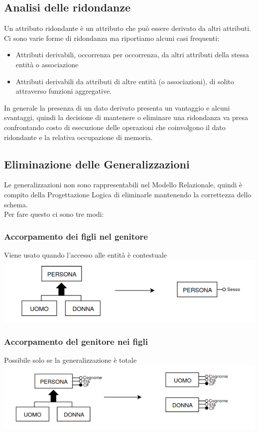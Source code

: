 \documentclass[12pt, a4paper, openany]{book}
\begin{document}
\subsection{Analisi delle ridondanze}
Un attributo ridondante è un attributo che può essere derivato da altri attributi. Ci sono varie forme di ridondanza ma riportiamo alcuni casi frequenti:
\begin{itemize}
    \item Attributi derivabili, occorrenza per occorrenza, da altri attributi della stessa entità o associazione
    \item Attributi derivabili da attributi di altre entità (o associazioni), di solito attraverso funzioni aggregative.

\end{itemize}
In generale la presenza di un dato derivato presenta un vantaggio e alcuni svantaggi, quindi la decisione di mantenere o eliminare una ridondanza va presa confrontando costo di esecuzione delle operazioni che coinvolgono il dato ridondante e la relativa occupazione di memoria.
\subsection{Eliminazione delle Generalizzazioni}
Le generalizzazioni non sono rappresentabili nel Modello Relazionale, quindi è compito della Progettazione Logica di eliminarle mantenendo la correttezza dello schema.\\
Per fare questo ci sono tre modi:
\subsubsection{Accorpamento dei figli nel genitore} Viene usato quando l'accesso alle entità è contestuale
\\\includegraphics[width=\textwidth]{generalizzazioni1.png}
\subsubsection{Accorpamento del genitore nei figli}
Possibile solo se la generalizzazione è totale
\\\includegraphics[width=\textwidth]{generalizzazioni2.png}
\end{document}
